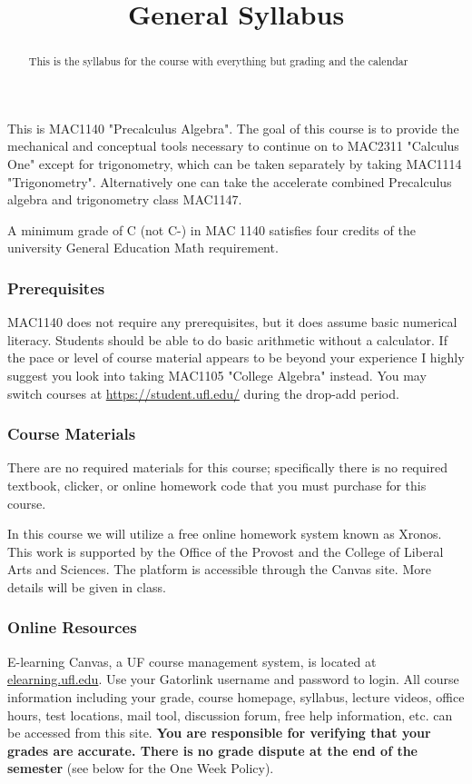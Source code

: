 \documentclass{ximera}
\title{General Syllabus}
\begin{document}
\begin{abstract}
This is the syllabus for the course with everything but grading and the calendar
\end{abstract}
\maketitle

This is MAC1140 "Precalculus Algebra". The goal of this course is to provide the mechanical and conceptual tools necessary to continue on to MAC2311 "Calculus One" except for trigonometry, which can be taken separately by taking MAC1114 "Trigonometry". Alternatively one can take the accelerate combined Precalculus algebra and trigonometry class MAC1147.

A minimum grade of C (not C-) in MAC 1140 satisfies four credits of the university General Education Math requirement.%

\subsubsection*{Prerequisites}
MAC1140 does not require any prerequisites, but it does assume basic numerical literacy. Students should be able to do basic arithmetic without a calculator. If the pace or level of course material appears to be beyond your experience I highly suggest you look into taking MAC1105 "College Algebra" instead. You may switch courses at \url{https://student.ufl.edu/} during the drop-add period.


\subsubsection*{Course Materials}
    There  are  no  required  materials for this course; specifically there is no required textbook, clicker, or online homework code that you must purchase for  this  course. %
    
    In this course we will utilize a free online homework system known as Xronos. This work is supported by the Office of the Provost and the College of Liberal Arts and Sciences.  The platform is accessible through the Canvas site.  More details will be given in class.


\subsubsection*{Online Resources}
    E-learning Canvas, a UF course management system, is located at \url{elearning.ufl.edu}.  Use your Gatorlink username and password to login.  All course information including your grade, course homepage, syllabus, lecture videos,  office  hours,  test locations,  mail tool,  discussion forum,  free help information,  etc. can be accessed from this site.  \textbf{You are responsible for verifying that your grades are accurate.  There is no grade dispute at the end of the semester} (see below for the One Week Policy).
\end{document}
